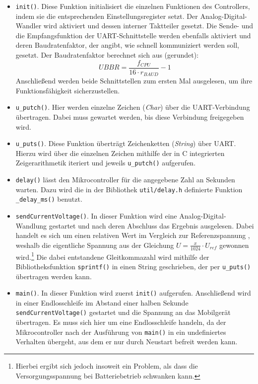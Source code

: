 \begin{itemize}
\item \texttt{init()}. Diese Funktion initialisiert die einzelnen Funktionen des Controllers, indem sie die entsprechenden Einstellungsregister \cite{Src:AtmelDBeins} setzt. Der Analog-Digital-Wandler wird aktiviert und dessen interner Taktteiler gesetzt. Die Sende- und die Empfangsfunktion der UART-Schnittstelle werden ebenfalls aktiviert und deren Baudratenfaktor, der angibt, wie schnell kommuniziert werden soll, gesetzt.
Der Baudratenfaktor \cite{Src:AtmelDBeins} berechnet sich aus (gerundet): \[UBBR = \frac{f_{CPU}}{16 \cdot r_{BAUD}} - 1 \]
Anschließend werden beide Schnittstellen zum ersten Mal ausgelesen, um ihre Funktionsfähigkeit sicherzustellen.
\item \texttt{u\_putch()}. Hier werden einzelne Zeichen (\textit{Char}) über die UART-Verbindung übertragen. Dabei muss gewartet werden, bis diese Verbindung freigegeben wird.
\item \texttt{u\_puts()}. Diese Funktion überträgt Zeichenketten (\textit{String}) über UART. Hierzu wird über die einzelnen Zeichen mithilfe der in C integrierten Zeigerarithmetik iteriert und jeweils \texttt{u\_putch()} aufgerufen.
\item \texttt{delay()} lässt den Mikrocontroller für die angegebene Zahl an Sekunden warten. Dazu wird die in der Bibliothek \texttt{util/delay.h} definierte Funktion \texttt{\_delay\_ms()} benutzt.
\item \texttt{sendCurrentVoltage()}. In dieser Funktion wird eine Analog-Digital-Wandlung gestartet und nach deren Abschluss das Ergebnis ausgelesen. Dabei handelt es sich um einen relativen Wert im Vergleich zur Referenzspannung \cite{Src:AVRTutor}, weshalb die eigentliche Spannung aus der Gleichung $U = \frac{x}{1024} \cdot U_{ref}$ gewonnen wird.\footnote{Hierbei ergibt sich jedoch insoweit ein Problem, als dass die Versorgungsspannung bei Batteriebetrieb schwanken kann.} Die dabei entstandene Gleitkommazahl wird mithilfe der Bibliotheksfunktion \texttt{sprintf()} in einen String geschrieben, der per \texttt{u\_puts()} übertragen werden kann.
\item \texttt{main()}. In dieser Funktion wird zuerst \texttt{init()} aufgerufen. Anschließend wird in einer Endlosschleife im Abstand einer halben Sekunde \texttt{sendCurrentVoltage()} gestartet und die Spannung an das Mobilgerät übertragen. Es muss sich hier um eine Endlosschleife handeln, da der Mikrocontroller nach der Ausführung von \texttt{main()} in ein undefiniertes Verhalten übergeht, aus dem er nur durch Neustart befreit werden kann.
\end{itemize}
